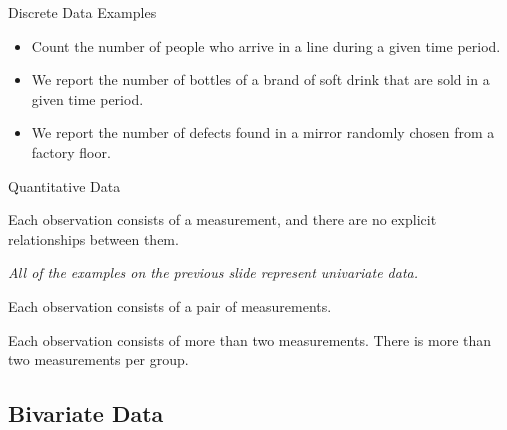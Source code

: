 \begin{frame}{Discrete Data Examples}

  \begin{itemize}
  \item Count the number of people who arrive in a line during a given
    time period.

  \item We report the number of bottles of a brand of soft drink that
    are sold in a given time period.

  \item We report the number of defects found in a mirror randomly
    chosen from a factory floor.

  \end{itemize}
  
\end{frame}


\begin{frame}{Quantitative Data}
  
  \begin{definition}

    Each observation consists of a measurement, and there are no
    explicit relationships between them.

    \textit{{\color{red}All of the examples on the previous slide
        represent univariate data.}}
    
  \end{definition}

  \begin{definition}

    Each observation consists of a pair of measurements.
    
  \end{definition}

  \begin{definition}

    Each observation consists of more than two measurements. There is
    more than two measurements per group.
    
  \end{definition}


\end{frame}



\subsection{Bivariate Data}


